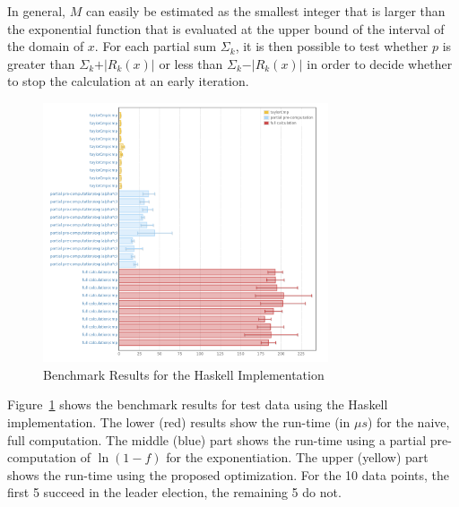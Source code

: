 \documentclass[11pt,a4paper,dvipsnames,twosided]{article}
\theoremstyle{definition}
\theoremstyle{definition}
\begin{document}
In general, $M$ can easily be estimated as the smallest
integer that is larger than the exponential function that is evaluated at
the upper bound of the interval of the domain of $x$. For each partial sum $\Sigma_{k}$, it
is then possible to test whether $p$ is greater than $\Sigma_k + \vert R_{k}(x) \vert$ or less than
$\Sigma_k - \vert R_{k}(x)\vert$ in order to decide whether to stop the calculation at an early
iteration.

\begin{figure}[ht]
  \centering
  \includegraphics[width=0.75\textwidth]{haskell.png}
  \caption{Benchmark Results for the Haskell Implementation}
  \label{fig:haskell-optimization-results}
\end{figure}

Figure~\ref{fig:haskell-optimization-results} shows the benchmark results for
test data using the Haskell implementation. The lower (red) results show the
run-time (in $\mu s$) for the naive, full computation. The middle (blue) part
shows the run-time using a partial pre-computation of $\ln (1-f)$ for the
exponentiation. The upper (yellow) part shows the run-time using the proposed
optimization. For the 10 data points, the first 5 succeed in the leader
election, the remaining 5 do not.

% 


\end{document}
